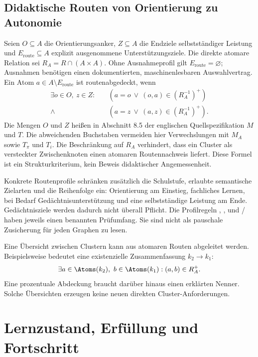 \subsection{Didaktische Routen von Orientierung zu Autonomie}
Seien $O\subseteq A$ die Orientierungsanker, $Z\subseteq A$ die
Endziele selbstständiger Leistung und $E_{\mathrm{route}}\subseteq A$
explizit ausgenommene Unterstützungsziele. Die direkte atomare Relation sei
$R_A=R\cap(A\times A)$. Ohne Ausnahmeprofil gilt
$E_{\mathrm{route}}=\varnothing$; Ausnahmen benötigen einen dokumentierten,
maschinenlesbaren Auswahlvertrag. Ein Atom $a\in A\setminus E_{\mathrm{route}}$
ist routenabgedeckt, wenn
\begin{equation}
 \begin{split}
 \exists o\in O,\ z\in Z:\quad
 &(a=o\ \lor\ (o,a)\in(R_A^{-1})^+)\\[-1mm]
 {}\land\;&(a=z\ \lor\ (a,z)\in(R_A^{-1})^+).
 \end{split}
\end{equation}
Die Mengen $O$ und $Z$ heißen in Abschnitt 8.5 der englischen
Quellspezifikation $M$ und $T$. Die abweichenden Buchstaben vermeiden hier
Verwechslungen mit $M_A$ sowie $T_\pi$ und $T_i$.
Die Beschränkung auf $R_A$ verhindert, dass ein Cluster als versteckter
Zwischenknoten einen atomaren Routennachweis liefert. Diese Formel ist
ein Strukturkriterium, kein Beweis didaktischer Angemessenheit.

Konkrete Routenprofile schränken zusätzlich die Schulstufe, erlaubte
semantische Zielarten und die Reihenfolge ein: Orientierung am Einstieg,
fachliches Lernen, bei Bedarf Gedächtnisunterstützung und eine selbstständige
Leistung am Ende. Gedächtnisziele werden dadurch nicht überall Pflicht.
Die Profilregeln , ,  und
/ haben jeweils einen benannten Prüfumfang.
Sie sind nicht als pauschale Zusicherung für jeden Graphen zu lesen.

Eine Übersicht zwischen Clustern kann aus atomaren Routen abgeleitet werden.
Beispielsweise bedeutet eine existenzielle Zusammenfassung $k_2\to k_1$:
\[
 \exists a\in\Atoms(k_2),\ b\in\Atoms(k_1):(a,b)\in R_A^+.
\]
Eine prozentuale Abdeckung braucht darüber hinaus einen erklärten Nenner.
Solche Übersichten erzeugen keine neuen direkten Cluster-Anforderungen.

\section{Lernzustand, Erfüllung und Fortschritt}
\label{sec:state}
